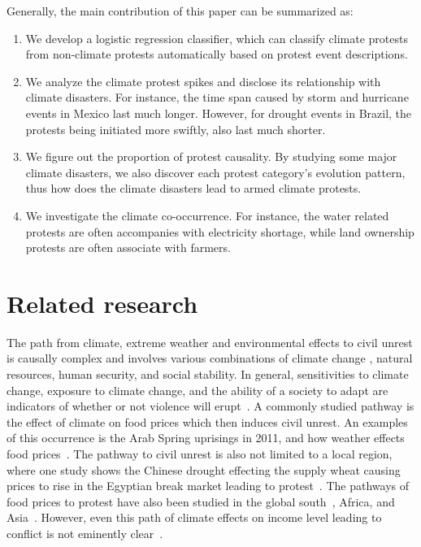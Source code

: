 \documentclass[9pt,twocolumn,twoside]{pnas-new}
\begin{document}


Generally, the main contribution of this paper can be summarized as:
\begin{enumerate}
  \item We develop a logistic regression classifier, which can classify climate protests from non-climate protests automatically based on protest event descriptions.
  \item We analyze the climate protest spikes and disclose its relationship with climate disasters. For instance, the time span caused by storm and hurricane events in Mexico last much longer. However, for drought events in Brazil, the protests being initiated more swiftly, also last much shorter.
  \item We figure out the proportion of protest causality. By studying some major climate disasters, we also discover each protest category's evolution pattern, thus how does the climate disasters lead to armed climate protests.
  \item We investigate the climate co-occurrence. For instance, the water related protests are often accompanies with electricity shortage, while land ownership protests are often associate with farmers.
\end{enumerate}
%

%

%
%
\section{Related research}
The path from climate, extreme weather and environmental effects to civil unrest is causally complex \cite{hsiang2011civil,RW5} and involves various combinations of climate change \cite{burke2014climate}, natural resources, human security, and social stability.
In general, sensitivities to climate change, exposure to climate change, and the ability of a society to adapt are indicators of whether or not violence will erupt~\cite{RW9}.
A commonly studied pathway is the effect of climate on food prices which then induces civil unrest.
An examples of this occurrence is the Arab Spring uprisings in 2011, and how weather effects food prices~\cite{RW2}.
The pathway to civil unrest is also not limited to a local region, where one study shows the Chinese drought effecting the supply wheat causing prices to rise in the Egyptian break market leading to protest~\cite{RW1}.
The pathways of food prices to protest have also been studied in the global south~\cite{RW4}, Africa, and Asia~\cite{wischnath2014climate,RW6}.
However, even this path of climate effects on income level leading to conflict is not eminently clear~\cite{RW10}.
\end{document}
